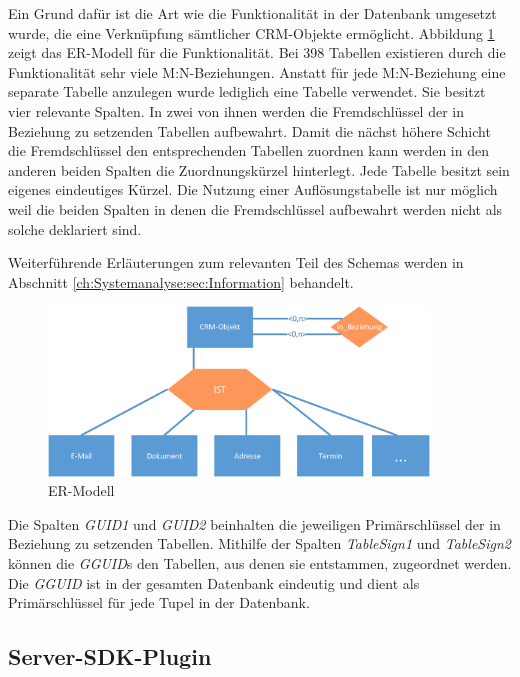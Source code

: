 Ein Grund dafür ist die Art wie die Funktionalität in der Datenbank umgesetzt wurde, die eine Verknüpfung sämtlicher CRM-Objekte ermöglicht. Abbildung \ref{gw_2} zeigt das ER-Modell für die Funktionalität. Bei 398 Tabellen existieren durch die Funktionalität sehr viele M:N-Beziehungen. Anstatt für jede M:N-Beziehung eine separate Tabelle anzulegen wurde lediglich eine Tabelle verwendet. Sie besitzt vier relevante Spalten. In zwei von ihnen werden die Fremdschlüssel der in Beziehung zu setzenden Tabellen aufbewahrt. Damit die nächst höhere Schicht die Fremdschlüssel den entsprechenden Tabellen zuordnen kann werden in den anderen beiden Spalten die Zuordnungskürzel hinterlegt. Jede Tabelle besitzt sein eigenes eindeutiges Kürzel. Die Nutzung einer Auflösungstabelle ist nur möglich weil die beiden Spalten in denen die Fremdschlüssel aufbewahrt werden nicht als solche deklariert sind.

Weiterführende Erläuterungen zum relevanten Teil des Schemas werden in Abschnitt \ref{ch:Systemanalyse:sec:Information} behandelt.

\begin{figure}[ht]
	\centering
  \includegraphics[width=0.9\textwidth, width=0.9\textwidth]{pics/erm.pdf}
	\caption{ER-Modell}
	\label{gw_2}
\end{figure}

Die Spalten \textit{GUID1} und \textit{GUID2} beinhalten die jeweiligen Primärschlüssel der in Beziehung zu setzenden Tabellen. Mithilfe der Spalten \textit{TableSign1} und \textit{TableSign2} können die \textit{GGUID}s den Tabellen, aus denen sie entstammen, zugeordnet werden. Die \textit{GGUID} ist in der gesamten Datenbank eindeutig und dient als Primärschlüssel für jede Tupel in der Datenbank.

\subsection{Server-SDK-Plugin}
\label{ch:Systemanalyse:sec:genesisWorld:subsec:plugin}

